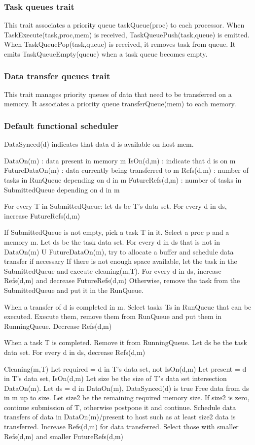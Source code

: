 \subsubsection{Task queues trait}
This trait associates a priority queue taskQueue(proc) to each processor.
When TaskExecute(task,proc,mem) is received, TaskQueuePush(task,queue) is emitted.
When TaskQueuePop(task,queue) is received, it removes task from queue.
It emits TaskQueueEmpty(queue) when a task queue becomes empty.

\subsubsection{Data transfer queues trait}
This trait manages priority queues of data that need to be transferred on a memory.
It associates a priority queue transferQueue(mem) to each memory.

\subsubsection{Default functional scheduler}
DataSynced(d) indicates that data d is available on host mem.

DataOn(m) : data present in memory m
IsOn(d,m) : indicate that d is on m
FutureDataOn(m)  : data currently being transferred to m
Refs(d,m) : number of tasks in RunQueue depending on d in m
FutureRefs(d,m) : number of tasks in SubmittedQueue depending on d in m


For every T in SubmittedQueue:
let ds be T's data set.
For every d in ds, increase FutureRefs(d,m)

If SubmittedQueue is not empty, pick a task T in it.
Select a proc p and a memory m.
Let ds be the task data set.
For every d in ds that is not in DataOn(m) U FutureDataOn(m), try to allocate a buffer and schedule data transfer if necessary
If there is not enough space available, let the task in the SubmittedQueue and execute cleaning(m,T).
For every d in ds, increase Refs(d,m) and decrease FutureRefs(d,m)
Otherwise, remove the task from the SubmittedQueue and put it in the RunQueue.

When a transfer of d is completed in m.
Select tasks Ts in RunQueue that can be executed.
Execute them, remove them from RunQueue and put them in RunningQueue.
Decrease Refs(d,m)

When a task T is completed.
Remove it from RunningQueue.
Let ds be the task data set.
For every d in ds, decrease Refs(d,m)

Cleaning(m,T)
Let required = {d in T's data set, not IsOn(d,m)}
Let present = {d in T's data set, IsOn(d,m)}
Let size be the size of T's data set intersection DataOn(m).
Let ds = {d in DataOn(m), DataSynced(d) is true}
Free data from ds in m up to size.
Let size2 be the remaining required memory size.
If size2 is zero, continue submission of T, otherwise postpone it and continue.
Schedule data transfers of data in DataOn(m)/present to host such as at least size2 data is transferred.
Increase Refs(d,m) for data transferred.
Select those with smaller Refs(d,m) and smaller FutureRefs(d,m)
